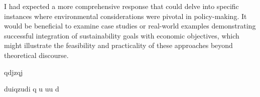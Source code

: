 I had expected a more comprehensive response that could delve into specific instances where environmental considerations were pivotal in policy-making. It would be beneficial to examine case studies or real-world examples demonstrating successful integration of sustainability goals with economic objectives, which might illustrate the feasibility and practicality of these approaches beyond theoretical discourse.

qdjzqj

duiqzudi
q
u
uu
d

